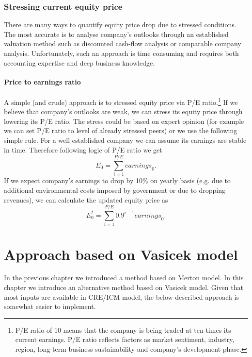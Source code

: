 \documentclass[a4paper]{book}
\begin{document}
\subsection{Stressing current equity price}

There are many ways to quantify equity price drop due to stressed conditions. The most accurate is to analyse company's outlooks through an established valuation method such as discounted cash-flow analysis or comparable company analysis. Unfortunately, such an approach is time consuming and requires both accounting expertise and deep business knowledge.

\subsubsection{Price to earnings ratio}

A simple (and crude) approach is to stressed equity price via P/E ratio.\footnote{P/E ratio of 10 means that the company is being traded at ten times its current earnings. P/E ratio reflects factors as market sentiment, industry, region, long-term business sustainability and company's development phase.} If we believe that company's outlooks are weak, we can stress its equity price through lowering its P/E ratio. The stress could be based on expert opinion (for example we can set P/E ratio to level of already stressed peers) or we use the following simple rule. For a well established company we can assume its earnings are stable in time. Therefore following logic of P/E ratio we get
\begin{equation}
E_0 = \sum_{i = 1}^{P/E} \textit{earnings}_0.
\end{equation}
If we expect company's earnings to drop by 10\% on yearly basis (e.g. due to additional environmental costs imposed by government or due to dropping revenues), we can calculate the updated equity price as
\begin{equation}
E_0^* = \sum_{i = 1}^{P/E} 0.9^{i - 1} \textit{earnings}_0.
\end{equation}

\chapter{Approach based on Vasicek model}

In the previous chapter we introduced a method based on Merton model. In this chapter we introduce an alternative method based on Vasicek model. Given that most inputs are available in CRE/ICM model, the below described approach is somewhat easier to implement.
\end{document}
